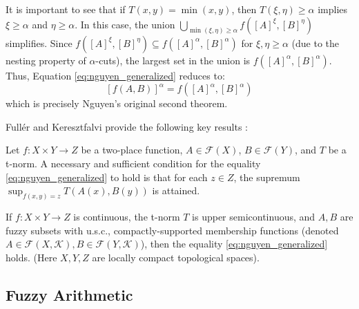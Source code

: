 It is important to see that if $T(x,y) = \min(x,y)$, then $T(\xi, \eta) \ge \alpha$ implies $\xi \ge \alpha$ and $\eta \ge \alpha$. In this case, the union $\bigcup_{\min(\xi, \eta) \ge \alpha} f([A]^\xi, [B]^\eta)$ simplifies. Since $f([A]^\xi, [B]^\eta) \subseteq f([A]^\alpha, [B]^\alpha)$ for $\xi, \eta \ge \alpha$ (due to the nesting property of $\alpha$-cuts), the largest set in the union is $f([A]^\alpha, [B]^\alpha)$. Thus, Equation \eqref{eq:nguyen_generalized} reduces to:
\[
[f(A, B)]^\alpha = f([A]^\alpha, [B]^\alpha)
\]
which is precisely Nguyen's original second theorem.

Fullér and Keresztfalvi provide the following key results \cite[Thms. 1.9.1, 1.9.2]{FULLER2}:
\begin{theorem}
    Let $f: X \times Y \to Z$ be a two-place function, $A \in \mathcal{F}(X)$, $B \in \mathcal{F}(Y)$, and $T$ be a t-norm. A necessary and sufficient condition for the equality \eqref{eq:nguyen_generalized} to hold is that for each $z \in Z$, the supremum $\sup_{f(x,y)=z} T(A(x), B(y))$ is attained.
\end{theorem}

\begin{theorem}
    If $f: X \times Y \to Z$ is continuous, the t-norm $T$ is upper semicontinuous, and $A, B$ are fuzzy subsets with u.s.c., compactly-supported membership functions (denoted $A \in \mathcal{F}(X, \mathcal{K}), B \in \mathcal{F}(Y, \mathcal{K})$), then the equality \eqref{eq:nguyen_generalized} holds.
    (Here $X, Y, Z$ are locally compact topological spaces).
\end{theorem}












\subsection{Fuzzy Arithmetic}
\label{sec:fuzzy_arithmetic}

